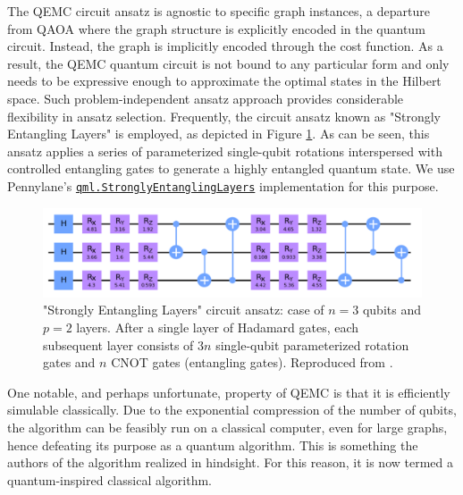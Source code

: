  The QEMC circuit ansatz is agnostic to specific graph instances, a departure from QAOA where the graph structure is explicitly encoded in the quantum circuit. Instead, the graph is implicitly encoded through the cost function. As a result, the QEMC quantum circuit is not bound to any particular form and only needs to be expressive enough to approximate the optimal states in the Hilbert space. Such problem-independent ansatz approach provides considerable flexibility in ansatz selection. Frequently, the circuit ansatz known as "Strongly Entangling Layers" is employed, as depicted in Figure \ref{fig:Strongly_Entangling_Layers}. As can be seen, this ansatz applies a series of parameterized single-qubit rotations interspersed with controlled entangling gates to generate a highly entangled quantum state. We use Pennylane's \href{https://docs.pennylane.ai/en/stable/code/api/pennylane.StronglyEntanglingLayers.html}{\texttt{qml.StronglyEntanglingLayers}} implementation for this purpose.

\begin{figure}[t]
    \centering
    \includegraphics[width = \textwidth]{Figures/Strongly_Entangling_Layers.png}
    \caption{"Strongly Entangling Layers" circuit ansatz: case of $n = 3$ qubits and $p = 2$ layers. After a single layer of Hadamard gates, each subsequent layer consists of $3n$ single-qubit parameterized rotation gates and $n$ CNOT gates (entangling gates). Reproduced from \cite{tenecohen2023variational}.}
    \label{fig:Strongly_Entangling_Layers}
\end{figure}


One notable, and perhaps unfortunate, property of QEMC is that it is efficiently simulable classically. Due to the exponential compression of the number of qubits, the algorithm can be feasibly run on a classical computer, even for large graphs, hence defeating its purpose as a quantum algorithm. This is something the authors of the algorithm \cite{tenecohen2023variational} realized in hindsight. For this reason, it is now termed a quantum-inspired classical algorithm.


